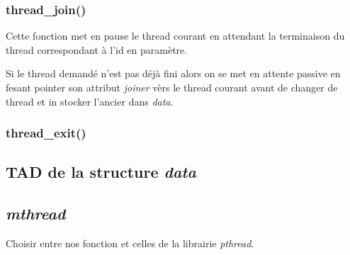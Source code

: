 \subsubsection{thread\_join()}
Cette fonction met en pause le thread courant en attendant la
terminaison du thread correspondant à l'id en paramètre.

Si le thread demandé n'est pas déjà fini alors on se met en attente
passive en fesant pointer son attribut \textit{joiner} vèrs le thread
courant avant de changer de thread et in stocker l'ancier dans
\textit{data}.



\subsubsection{thread\_exit()}



\subsection{TAD de la structure \textit{data}}




\subsection{\textit{mthread}}
Choisir entre nos fonction et celles de la librairie \textit{pthread}.
